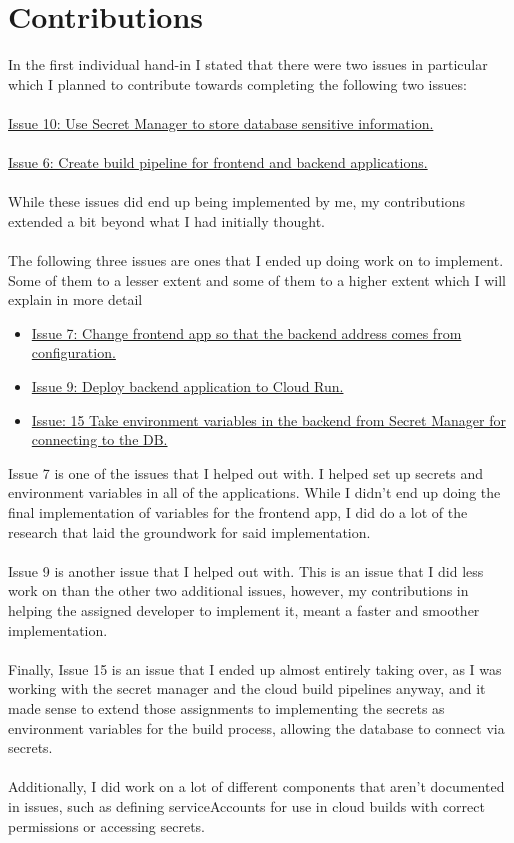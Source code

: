 \section{Contributions}
In the first individual hand-in I stated that there were two issues in particular which I planned to contribute towards completing the following two issues:\\\\
\href{https://gitlab.sdu.dk/jolee18/cloud-bite-terraform-g-10/-/issues/10}{Issue 10: Use Secret Manager to store database sensitive information.}\\\\
\href{https://gitlab.sdu.dk/jolee18/cloud-bite-terraform-g-10/-/issues/6}{Issue 6: Create build pipeline for frontend and backend applications.}\\\\
While these issues did end up being implemented by me, my contributions extended a bit beyond what I had initially thought.
\\\\
The following three issues are ones that I ended up doing work on to implement. Some of them to a lesser extent and some of them to a higher extent which I will explain in more detail

\begin{itemize}
    \item \href{https://gitlab.sdu.dk/jolee18/cloud-bite-terraform-g-10/-/issues/7}{Issue 7: Change frontend app so that the backend address comes from configuration.}
    \item 
    \href{https://gitlab.sdu.dk/jolee18/cloud-bite-terraform-g-10/-/issues/9}{Issue 9: Deploy backend application to Cloud Run.}
    \item 
    \href{https://gitlab.sdu.dk/jolee18/cloud-bite-terraform-g-10/-/issues/15}{Issue: 15 Take environment variables in the backend from Secret Manager for connecting to the DB.}
\end{itemize}
Issue 7 is one of the issues that I helped out with. I helped set up secrets and environment variables in all of the applications. While I didn't end up doing the final implementation of variables for the frontend app, I did do a lot of the research that laid the groundwork for said implementation.
\\\\
Issue 9 is another issue that I helped out with. This is an issue that I did less work on than the other two additional issues, however, my contributions in helping the assigned developer to implement it, meant a faster and smoother implementation.
\\\\
Finally, Issue 15 is an issue that I ended up almost entirely taking over, as I was working with the secret manager and the cloud build pipelines anyway, and it made sense to extend those assignments to implementing the secrets as environment variables for the build process, allowing the database to connect via secrets.
\\\\
Additionally, I did work on a lot of different components that aren't documented in issues, such as defining serviceAccounts for use in cloud builds with correct permissions or accessing secrets.